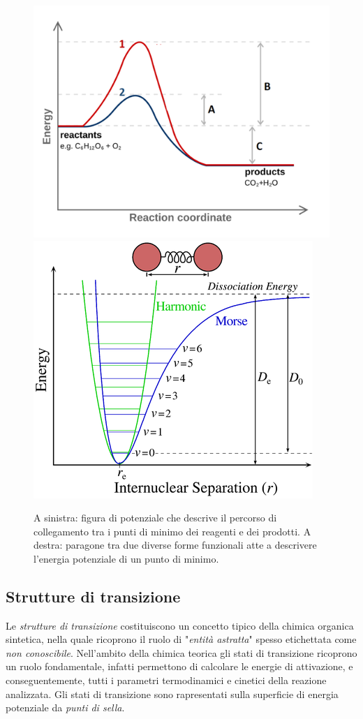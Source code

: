 \documentclass[oneside]{amsbook}
\numberwithin{section}{chapter}
\numberwithin{equation}{section}
\numberwithin{figure}{section}
\begin{document}
\begin{figure}[H]
\centering
\caption{ A sinistra: figura di potenziale che descrive il percorso di collegamento tra i punti di minimo dei reagenti e dei prodotti. A destra: paragone tra due diverse forme funzionali atte a descrivere l'energia potenziale di un punto di minimo.}\label{rep}
\includegraphics[scale=0.3]{rep}
\hfil
\includegraphics[scale=0.3]{pot}
\end{figure}

\subsection{Strutture di transizione}
Le \emph{strutture di transizione} costituiscono un concetto tipico della chimica organica sintetica, nella quale ricoprono il ruolo di "\emph{entità astratta}" spesso etichettata come \emph{non conoscibile}.
Nell'ambito della chimica teorica gli stati di transizione ricoprono un ruolo fondamentale, infatti permettono di calcolare le energie di attivazione, e conseguentemente, tutti i parametri  termodinamici e cinetici della reazione analizzata.
Gli stati di transizione sono rapresentati sulla superficie di energia potenziale da \emph{punti di sella}.
\end{document}
